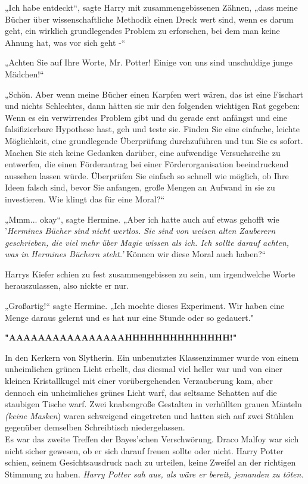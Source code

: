 {„Ich habe entdeckt“, sagte Harry mit zusammengebissenen Zähnen, „dass meine Bücher über wissenschaftliche Methodik einen Dreck wert sind, wenn es darum geht, ein wirklich grundlegendes Problem zu erforschen, bei dem man keine Ahnung hat, was vor sich geht -“

„Achten Sie auf Ihre Worte, Mr. Potter! Einige von uns sind unschuldige junge Mädchen!“

„Schön. Aber wenn meine Bücher einen Karpfen wert wären, das ist eine Fischart und nichts Schlechtes, dann hätten sie mir den folgenden wichtigen Rat gegeben: Wenn es ein verwirrendes Problem gibt und du gerade erst anfängst und eine falsifizierbare Hypothese hast, geh und teste sie. Finden Sie eine einfache, leichte Möglichkeit, eine grundlegende Überprüfung durchzuführen und tun Sie es sofort. Machen Sie sich keine Gedanken darüber, eine aufwendige Versuchsreihe zu entwerfen, die einen Förderantrag bei einer Förderorganisation beeindruckend aussehen lassen würde. Überprüfen Sie einfach so schnell wie möglich, ob Ihre Ideen falsch sind, bevor Sie anfangen, große Mengen an Aufwand in sie zu investieren. Wie klingt das für eine Moral?“

„Mmm... okay“, sagte Hermine. „Aber ich hatte auch auf etwas gehofft wie '\emph{Hermines Bücher sind nicht wertlos. Sie sind von weisen alten Zauberern geschrieben, die viel mehr über Magie wissen als ich. Ich sollte darauf achten, was in Hermines Büchern steht.'} Können wir diese Moral auch haben?“

Harrys Kiefer schien zu fest zusammengebissen zu sein, um irgendwelche Worte herauszulassen, also nickte er nur.

„Großartig!“ sagte Hermine. „Ich mochte dieses Experiment. Wir haben eine Menge daraus gelernt und es hat nur eine Stunde oder so gedauert."

\textbf{"AAAAAAAAAAAAAAAAHHHHHHHHHHHHHH!"}

In den Kerkern von Slytherin. Ein unbenutztes Klassenzimmer wurde von einem unheimlichen grünen Licht erhellt, das diesmal viel heller war und von einer kleinen Kristallkugel mit einer vorübergehenden Verzauberung kam, aber dennoch ein unheimliches grünes Licht warf, das seltsame Schatten auf die staubigen Tische warf. Zwei knabengroße Gestalten in verhüllten grauen Mänteln \emph{(keine Masken}) waren schweigend eingetreten und hatten sich auf zwei Stühlen gegenüber demselben Schreibtisch niedergelassen.\\ Es war das zweite Treffen der Bayes'schen Verschwörung. Draco Malfoy war sich nicht sicher gewesen, ob er sich darauf freuen sollte oder nicht. Harry Potter schien, seinem Gesichtsausdruck nach zu urteilen, keine Zweifel an der richtigen Stimmung zu haben. \emph{Harry Potter sah aus, als wäre er bereit, jemanden zu töten.}

}
